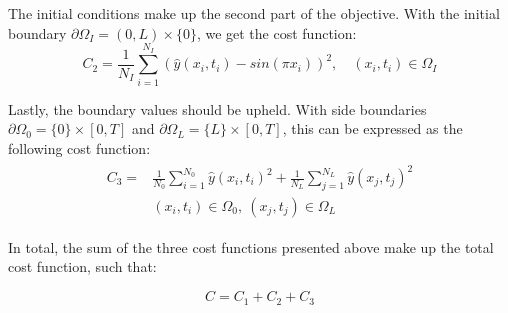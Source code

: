 The initial conditions make up the second part of the objective. With the initial boundary $\partial\Omega_I = (0, L) \times \{0\}$, we get the cost function: 
\begin{equation}
    C_2 = \frac{1}{N_I}\sum_{i=1}^{N_I}(\hat{y}(x_i, t_i)-sin(\pi x_i))^2, \quad (x_i, t_i) \in \Omega_I
\end{equation}


Lastly, the boundary values should be upheld. With side boundaries $\partial\Omega_0 =  \{0\} \times [0, T]$ and $\partial\Omega_L = \{L\} \times [0, T]$, this can be expressed as the following cost function: 
\begin{align}
\begin{split}
    C_3 =& \frac{1}{N_0}\sum_{i=1}^{N_0}\hat{y}(x_i,t_i)^2+\frac{1}{N_L}\sum_{j=1}^{N_L}\hat{y}(x_j, t_j)^2 \\ &(x_i, t_i)\in \Omega_0, \ (x_j, t_j) \in \Omega_L 
\end{split}
\end{align}

In total, the sum of the three cost functions presented above make up the total cost function, such that:

\begin{equation}
    C = C_1 + C_2 + C_3
\end{equation}


